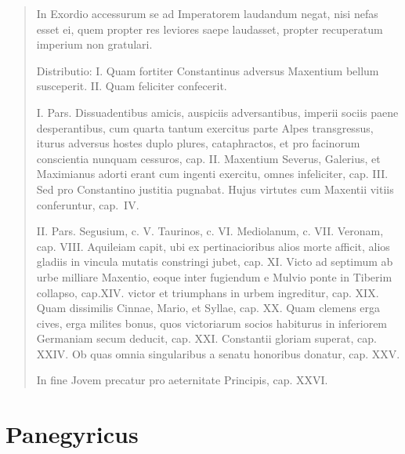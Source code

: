 \begin{quotation}

\noindent In Exordio accessurum se ad Imperatorem laudandum negat, nisi nefas esset ei, quem propter res leviores saepe laudasset, propter recuperatum imperium non gratulari.

\noindent Distributio: I. Quam fortiter Constantinus adversus Maxentium bellum susceperit. II. Quam feliciter confecerit.


\noindent I. Pars. Dissuadentibus amicis, auspiciis adversantibus, imperii sociis paene desperantibus, cum quarta tantum exercitus parte Alpes transgressus, iturus adversus hostes duplo plures, cataphractos, et pro facinorum conscientia nunquam cessuros, cap. II. Maxentium Severus, Galerius, et Maximianus adorti erant cum ingenti exercitu, omnes infeliciter, cap. III. Sed pro Constantino justitia pugnabat. Hujus virtutes cum Maxentii vitiis conferuntur, cap.\ IV. 

\noindent II. Pars. Segusium, c. V. Taurinos, c. VI. Mediolanum, c. VII. Veronam, cap. VIII. Aquileiam capit, ubi ex pertinacioribus alios morte afficit, alios gladiis in vincula mutatis constringi jubet, cap. XI. Victo ad septimum ab urbe milliare Maxentio, eoque inter fugiendum e Mulvio ponte in Tiberim collapso, cap.XIV. victor et triumphans in urbem ingreditur, cap. XIX. Quam dissimilis Cinnae, Mario, et Syllae, cap. XX. Quam clemens erga cives, erga milites bonus, quos victoriarum socios habiturus in inferiorem Germaniam secum deducit, cap. XXI. Constantii gloriam superat, cap. XXIV. Ob quas omnia singularibus a senatu honoribus donatur, cap. XXV.

\noindent In fine Jovem precatur pro aeternitate Principis, cap. XXVI.
\end{quotation}

\section*{Panegyricus} 

